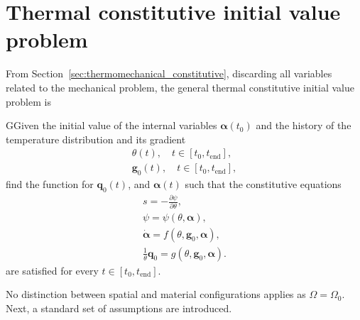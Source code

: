 \section{Thermal constitutive initial value problem}

From Section~\ref{sec:thermomechanical_constitutive}, discarding all variables related to the mechanical problem, the general thermal constitutive initial value problem is
\begin{problem}
GGiven the initial value of the internal variables \(\bm \alpha(t_0)\) and the history of the temperature distribution and its gradient
\begin{gather}
\theta(t),\quad t\in[t_0, t_\text{end}],\\
\bm g_0(t), \quad t\in[t_0, t_\text{end}],
\end{gather}
find the function for $\bm q_0(t)$, and \(\bm \alpha(t)\) such that the constitutive equations
\begin{gather}
    s = -\frac{\partial \psi}{\partial \theta},\label{eq:entropy_constitutive_relation}\\
    \psi = \psi(\theta, \bm \alpha),\\
    \dot{\bm \alpha} = f(\theta, \bm g_0, \bm \alpha),\\
    \frac{1}{\theta}\bm q_0 = g(\theta, \bm g_0, \bm \alpha).
\end{gather}
are satisfied for every $t\in [t_0, t_\text{end}]$.
\end{problem}
No distinction between spatial and material configurations applies as \(\Omega = \Omega_0\).
Next, a standard set of assumptions are introduced.

